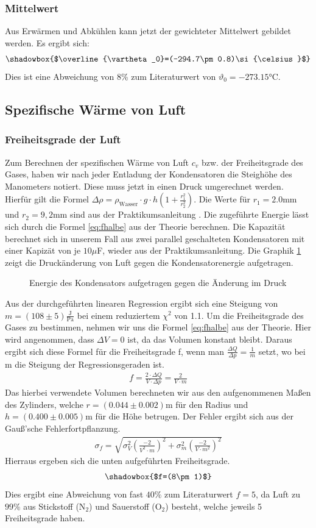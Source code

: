 \documentclass[12pt,a4paper,titlepage,headinclude,bibtotoc]{scrartcl}
\begin{document}
\subsubsection{Mittelwert}
Aus Erwärmen und Abkühlen kann jetzt der gewichteter Mittelwert gebildet werden.
Es ergibt sich:
$$\shadowbox{$\overline{\vartheta_0}=(-294.7\pm0.8)\si{\celsius}$}$$
Dies ist eine Abweichung von 8\% zum Literaturwert von $\vartheta_0=-273.15\si{\celsius}$.

\subsection{Spezifische Wärme von Luft}
\subsubsection{Freiheitsgrade der Luft}
Zum Berechnen der spezifischen Wärme von Luft $c_v$ bzw. der Freiheitsgrade des Gases, haben wir nach jeder Entladung der Kondensatoren die Steighöhe des Manometers notiert.
Diese muss jetzt in einen Druck umgerechnet werden.
Hierfür gilt die Formel $\Delta \rho = \rho_\text{Wasser} \cdot g \cdot h\left(1+\frac{r_1^2}{r_2^2}\right)$.
Die Werte für $r_1=2.0$mm und $r_2=9,2$mm sind aus der Praktikumsanleitung \cite[S. 73]{prakti}.
Die zugeführte Energie lässt sich durch die Formel \ref{eq:fhalbe} aus der Theorie berechnen.
Die Kapazität berechnet sich in unserem Fall aus zwei parallel geschalteten Kondensatoren mit einer Kapizät von je $10\mu$F, wieder aus der Praktikumsanleitung.
Die Graphik \ref{fig:druckwarm} zeigt die Druckänderung von Luft gegen die Kondensatorenergie aufgetragen.
\begin{figure}[!h]
\centering

\caption{Energie des Kondensators aufgetragen gegen die Änderung im Druck}
\label{fig:druckwarm}
\end{figure}
Aus der durchgeführten linearen Regression ergibt sich eine Steigung von $m=(108\pm5)\frac{\text{J}}{\text{Pa}}$
bei einem reduziertem $\chi^2$ von 1.1.
Um die Freiheitsgrade des Gases zu bestimmen, nehmen wir uns die Formel \eqref{eq:fhalbe}
aus der Theorie.
Hier wird angenommen, dass $\Delta V=0$ ist, da das Volumen konstant bleibt.
Daraus ergibt sich diese Formel für die Freiheitsgrade f, wenn man $\frac{\Delta Q}{\Delta p}=\frac1m$ setzt, wo bei m die Steigung der Regressionsgeraden ist.
\begin{align}
	f= \frac{2\cdot \Delta Q}{V\cdot \Delta p}=\frac{2}{V\cdot m}
\end{align}
Das hierbei verwendete Volumen berechneten wir aus den aufgenommenen Maßen des Zylinders, welche $r=(0.044\pm 0.002)$m für den Radius und $h=(0.400\pm 0.005)$m für die Höhe betrugen.
Der Fehler ergibt sich aus der Gauß'sche Fehlerfortpflanzung.
\begin{align}
	\sigma_f=\sqrt{\sigma_V^2\left(\frac{-2}{V^2\cdot m}\right)^2+\sigma_m^2\left(\frac{-2}{V\cdot m^2}\right)^2}
\end{align}
Hierraus ergeben sich die unten aufgeführten Freiheitsgrade.
$$\shadowbox{$f=(8\pm 1)$}$$
Dies ergibt eine Abweichung von fast $40\%$ zum Literaturwert $f=5$, da Luft zu $99\%$ aus Stickstoff (N$_2$) und Sauerstoff (O$_2$) besteht, welche jeweils 5 Freiheitsgrade haben.
\end{document}
